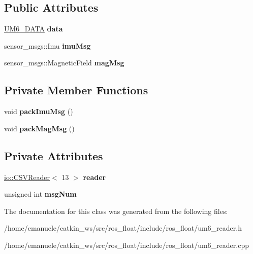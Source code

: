 \subsection*{Public Attributes}
\begin{DoxyCompactItemize}
\item 
\mbox{\label{classUM6__reader_a7f50e5345f41317f98483698f94b8a0a}} 
\hyperlink{structUM6__DATA}{U\+M6\+\_\+\+D\+A\+TA} {\bfseries data}
\item 
\mbox{\label{classUM6__reader_a8125a580ce28b4832482eadee969914c}} 
sensor\+\_\+msgs\+::\+Imu {\bfseries imu\+Msg}
\item 
\mbox{\label{classUM6__reader_adf090821e5feb18b0c1a7b360b459117}} 
sensor\+\_\+msgs\+::\+Magnetic\+Field {\bfseries mag\+Msg}
\end{DoxyCompactItemize}
\subsection*{Private Member Functions}
\begin{DoxyCompactItemize}
\item 
\mbox{\label{classUM6__reader_a180ef21f2b44ba6424b085683733d499}} 
void {\bfseries pack\+Imu\+Msg} ()
\item 
\mbox{\label{classUM6__reader_a97a73a034843017ed137be83d4c9b80f}} 
void {\bfseries pack\+Mag\+Msg} ()
\end{DoxyCompactItemize}
\subsection*{Private Attributes}
\begin{DoxyCompactItemize}
\item 
\mbox{\label{classUM6__reader_adb7e15fec787175b180bad466a428b09}} 
\hyperlink{classio_1_1CSVReader}{io\+::\+C\+S\+V\+Reader}$<$ 13 $>$ {\bfseries reader}
\item 
\mbox{\label{classUM6__reader_a64f023ad297d475d79a17a2e8ac17d93}} 
unsigned int {\bfseries msg\+Num}
\end{DoxyCompactItemize}


The documentation for this class was generated from the following files\+:\begin{DoxyCompactItemize}
\item 
/home/emanuele/catkin\+\_\+ws/src/ros\+\_\+float/include/ros\+\_\+float/um6\+\_\+reader.\+h\item 
/home/emanuele/catkin\+\_\+ws/src/ros\+\_\+float/include/ros\+\_\+float/um6\+\_\+reader.\+cpp\end{DoxyCompactItemize}
